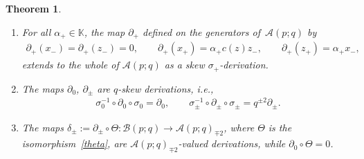 \documentclass[pdftex]{sigma}
\numberwithin{equation}{section}
\newtheorem{Theorem}{Theorem}[section]
\def\Weyl#1#2{{\mathcal{B}}(#1;#2)}
\def\AWeyl#1#2{{\mathcal{A}}(#1;#2)}
\begin{document}
\begin{Theorem}
\begin{enumerate}
extends to the whole of $\AWeyl p q$ as a skew $\sigma_-$-derivation.
\item[$(4)$] For all $\alpha_+ \in {\mathbb K}$, the map $\partial_+$ defined on the generators of~$\AWeyl p q$ by
\begin{gather*}%
\partial_+(x_-)=\partial_+(z_-) = 0, \qquad \partial_+(x_+) = \alpha_+ c(z) z_-,\qquad \partial_+(z_+) = \alpha_+ x_-,
\end{gather*}
extends to the whole of $\AWeyl p q$ as a skew $\sigma_+$-derivation.
\item[$(5)$] The maps $\partial_0$, $\partial_{\pm}$ are $q$-skew derivations, i.e.,
\begin{gather}\label{q}
\sigma_0^{-1}\circ \partial_0 \circ \sigma_0 = \partial_0, \qquad \sigma_\pm^{-1}\circ \partial_\pm \circ \sigma_\pm = q^{\pm 2} \partial_\pm.
\end{gather}
\item[$(6)$] The maps $\delta_\pm := \partial_\pm\circ \Theta\colon \Weyl p q \to \AWeyl p q_ {\mp 2}$, where $\Theta$ is the isomorphism~\eqref{theta}, are $\AWeyl p q_{\mp 2}$-valued derivations, while $\partial_0\circ \Theta =0$.
\end{enumerate}
\end{Theorem}
\end{document}
